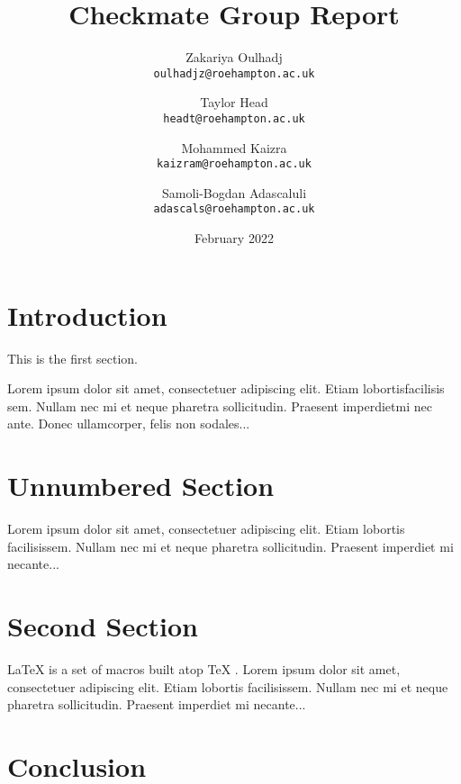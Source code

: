\documentclass{report}
\title{Checkmate Group Report}
\author{
  Zakariya Oulhadj\\
  \texttt{oulhadjz@roehampton.ac.uk}
  \and
  Taylor Head\\
  \texttt{headt@roehampton.ac.uk}
  \and
  Mohammed Kaizra\\
  \texttt{kaizram@roehampton.ac.uk}
  \and
  Samoli-Bogdan Adascaluli\\
  \texttt{adascals@roehampton.ac.uk}
}
\date{February 2022}
\begin{document}
\maketitle
\tableofcontents


\section{Introduction}
   
This is the first section.
      
Lorem  ipsum  dolor  sit  amet,  consectetuer  adipiscing  
elit.   Etiam  lobortisfacilisis sem.  Nullam nec mi et 
neque pharetra sollicitudin.  Praesent imperdietmi nec ante. 
Donec ullamcorper, felis non sodales...
       
\section*{Unnumbered Section}

Lorem ipsum dolor sit amet, consectetuer adipiscing elit.  
Etiam lobortis facilisissem.  Nullam nec mi et neque pharetra 
sollicitudin.  Praesent imperdiet mi necante...

\section{Second Section}

\LaTeX{} \cite{latex2e} is a set of macros built atop \TeX{} \cite{texbook}.
Lorem ipsum dolor sit amet, consectetuer adipiscing elit.  
Etiam lobortis facilisissem.  Nullam nec mi et neque pharetra 
sollicitudin.  Praesent imperdiet mi necante...
         
\section{Conclusion}


\newpage


 
\end{document}
